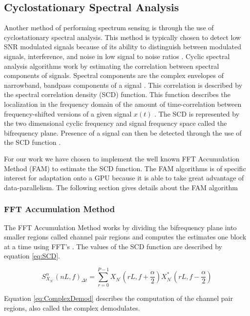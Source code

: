 \subsection{Cyclostationary Spectral Analysis}
\label{sect:cyclo}
Another method of performing spectrum sensing is through the use of cyclostationary spectral analysis.  This method is typically chosen to detect low SNR modulated signals because of its ability to distinguish between modulated signals, interference, and noise in low signal to noise ratios \cite{FenChenWan08}.  Cyclic spectral analysis algorithms work by estimating the correlation between spectral components of signals.  Spectral components are the complex envelopes of narrowband, bandpass components of a signal \cite{RobBroLoo91}.  This correlation is described by the spectral correlation density (SCD) function.  This function describes the localization in the frequency domain of the amount of time-correlation between frequency-shifted versions of a given signal $x(t)$ \cite{Costa96}.  The SCD is represented by the two dimensional cyclic frequency and signal frequency space \cite{FenChenWan08} called the bifrequency plane.  Presence of a signal can then be detected through the use of the SCD function \cite{Costa96}.

For our work we have chosen to implement the well known FFT Accumulation Method (FAM) to estimate the SCD function.  The FAM algorithms is of specific interest for adaptation onto a GPU because it is able to take great advantage of data-parallelism.  The following section gives details about the FAM algorithm

\subsubsection{FFT Accumulation Method}
\label{sect:FAM}
The FFT Accumulation Method works by dividing the bifrequency plane into smaller regions called channel pair regions and computes the estimates one block at a time using FFT's \cite{Pace03}.  The values of the SCD function are described by equation \ref{eq:SCD}.

\begin{equation}
S^{\alpha}_{X_{N^\prime}} {(n L, f)}_{\Delta t} = \sum_{r=0}^{P-1} X_{N^\prime}(r L,f + \frac{\alpha}{2}) X_{N^\prime}^*(r L, f - \frac{\alpha}{2})
\label{eq:SCD}
\end{equation}

Equation \ref{eq:ComplexDemod} describes the computation of the channel pair regions, also called the complex demodulates.

